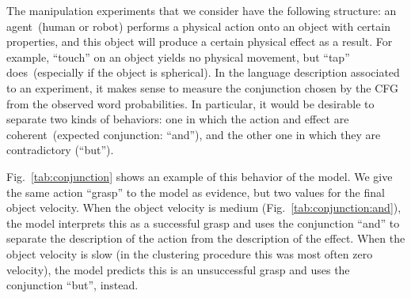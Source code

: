The manipulation experiments that we consider have the following structure: an agent~(human or robot) performs a physical action onto an object with certain properties, and this object will produce a certain physical effect as a result.
For example, ``touch'' on an object yields no physical movement, but ``tap'' does~(especially if the object is spherical).
In the language description associated to an experiment, it makes sense to measure the conjunction chosen by the \acf{CFG} from the observed word probabilities.
In particular, it would be desirable to separate two kinds of behaviors: one in which the action and effect are coherent~(expected conjunction: ``and''), and the other one in which they are contradictory (``but'').

Fig.~\ref{tab:conjunction} shows an example of this behavior of the model.
We give the same action ``grasp'' to the model as evidence, but two values for the final object velocity.
When the object velocity is medium (Fig.~\ref{tab:conjunction:and}), the model interprets this as a successful grasp and uses the conjunction ``and'' to separate the description of the action from the description of the effect.
When the object velocity is slow (in the clustering procedure this was most often zero velocity), the model predicts this is an unsuccessful grasp and uses the conjunction ``but'', instead.

